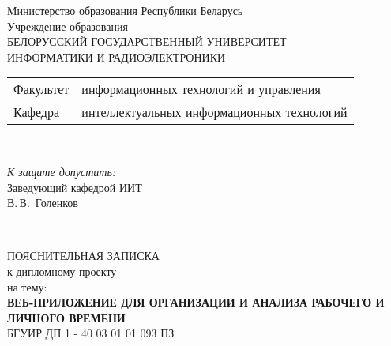\begin{titlepage}
  \begin{center}
    Министерство образования Республики Беларусь\\[1em]
    Учреждение образования\\
    БЕЛОРУССКИЙ ГОСУДАРСТВЕННЫЙ УНИВЕРСИТЕТ \\
    ИНФОРМАТИКИ И РАДИОЭЛЕКТРОНИКИ\\[1em]

    \begin{minipage}{\textwidth}
      \begin{flushleft}
        \begin{tabular}{ l l }
          Факультет & информационных технологий и управления\\
          Кафедра   & интеллектуальных информационных технологий
        \end{tabular}
      \end{flushleft}
    \end{minipage}\\[1em]

    \begin{flushright}
      \begin{minipage}{0.4\textwidth}
        \textit{К защите допустить:}\\[0.8em]
        Заведующий кафедрой ИИТ\\[0.45em]
        \underline{\hspace*{2.8cm}} В.\,В.~Голенков
      \end{minipage}\\[2.2em]
    \end{flushright}

    {ПОЯСНИТЕЛЬНАЯ ЗАПИСКА}\\
    {к дипломному проекту}\\
    {на тему:}\\[1em]
    \textbf{\large ВЕБ-ПРИЛОЖЕНИЕ ДЛЯ ОРГАНИЗАЦИИ И АНАЛИЗА РАБОЧЕГО И ЛИЧНОГО ВРЕМЕНИ}\\[1em]


    {БГУИР ДП 1 - 40 03 01 01 093 ПЗ}\\[2em]
    

\end{center}
\end{titlepage}

